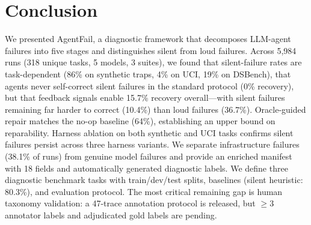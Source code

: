 \section{Conclusion}
\label{sec:conc}

We presented AgentFail, a diagnostic framework that decomposes LLM-agent failures into five stages and distinguishes silent from loud failures. Across 5{,}984 runs (318 unique tasks, 5 models, 3 suites), we found that silent-failure rates are task-dependent (86\% on synthetic traps, 4\% on UCI, 19\% on DSBench), that agents never self-correct silent failures in the standard protocol (0\% recovery), but that feedback signals enable 15.7\% recovery overall---with silent failures remaining far harder to correct (10.4\%) than loud failures (36.7\%). Oracle-guided repair matches the no-op baseline (64\%), establishing an upper bound on reparability. Harness ablation on both synthetic and UCI tasks confirms silent failures persist across three harness variants. We separate infrastructure failures (38.1\% of runs) from genuine model failures and provide an enriched manifest with 18 fields and automatically generated diagnostic labels. We define three diagnostic benchmark tasks with train/dev/test splits, baselines (silent heuristic: 80.3\%), and evaluation protocol. The most critical remaining gap is human taxonomy validation: a 47-trace annotation protocol is released, but $\geq 3$ annotator labels and adjudicated gold labels are pending.
